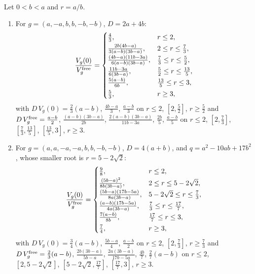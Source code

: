 \begin{theorem}
\label{thm:twomagprice}
Let $0<b<a$ and $r=a/b$.
\begin{enumerate}
\item For $g=(a,-a,b,b,-b,-b)$, $D=2a+4b$:
\[
\frac{V_g(0)}{V_g^{\rm free}}=
\begin{cases}
\frac43, & r\le2,\\[2pt]
\frac{2b(4b-a)}{3(a-b)(3b-a)}, & 2\le r\le\frac73,\\[2pt]
\frac{(4b-a)(11b-3a)}{6(a-b)(3b-a)}, & \frac73\le r\le\frac52,\\[2pt]
\frac{11b-3a}{6(3b-a)}, & \frac52\le r\le\frac{13}5,\\[2pt]
\frac{5(a-b)}{6b}, & \frac{13}5\le r\le3,\\[2pt]
\frac53, & r\ge3,
\end{cases}
\]
with $D\,V_g(0)=\frac23(a-b)$, $\frac{4b-a}3$, $\frac{a-b}3$ on $r\le2$, $[2,\frac52]$, $r\ge\frac52$ and
$D\,V_g^{\rm free}=\frac{a-b}2$, $\frac{(a-b)(3b-a)}{2b}$, $\frac{2(a-b)(3b-a)}{11b-3a}$, $\frac{2b}5$,
$\frac{a-b}5$ on $r\le2$, $[2,\frac73]$, $[\frac73,\frac{13}5]$, $[\frac{13}5,3]$, $r\ge3$.
\item For $g=(a,a,-a,-a,b,b,-b,-b)$, $D=4(a+b)$, and $q=a^2-10ab+17b^2$, whose smaller root is
$r=5-2\sqrt2$:
\[
\frac{V_g(0)}{V_g^{\rm free}}=
\begin{cases}
\frac98, & r\le2,\\[2pt]
\frac{(5b-a)^2}{8b(3b-a)}, & 2\le r\le5-2\sqrt2,\\[2pt]
\frac{(5b-a)(17b-5a)}{8a(3b-a)}, & 5-2\sqrt2\le r\le\frac73,\\[2pt]
\frac{(a-b)(17b-5a)}{4a(3b-a)}, & \frac73\le r\le\frac{17}7,\\[2pt]
\frac{7(a-b)}{8b}, & \frac{17}7\le r\le3,\\[2pt]
\frac74, & r\ge3,
\end{cases}
\]
with $D\,V_g(0)=\frac34(a-b)$, $\frac{5b-a}4$, $\frac{a-b}2$ on $r\le2$, $[2,\frac73]$, $r\ge\frac73$ and
$D\,V_g^{\rm free}=\frac23(a-b)$, $\frac{2b(3b-a)}{5b-a}$, $\frac{2a(3b-a)}{17b-5a}$, $\frac{4b}7$,
$\frac27(a-b)$ on $r\le2$, $[2,5-2\sqrt2]$, $[5-2\sqrt2,\frac{17}7]$, $[\frac{17}7,3]$, $r\ge3$.
\end{enumerate}
\end{theorem}

